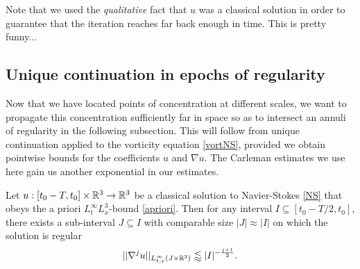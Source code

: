 \begin{remark}
	Note that we used the \textit{qualitative} fact that $u$ was a classical solution in order to guarantee that the iteration reaches far back enough in time. This is pretty funny...
\end{remark}



\subsection{Unique continuation in epochs of regularity}

Now that we have located points of concentration at different scales, we want to propagate this concentration sufficiently far in space so as to intersect an annuli of regularity in the following subsection. This will follow from unique continuation applied to the vorticity equation \eqref{vortNS}, provided we obtain pointwise bounds for the coefficients $u$ and $\nabla u$. The Carleman estimates we use here gain us another exponential in our estimates. 

\begin{proposition}\label{prop:epoch}
	Let $u : [t_0 - T, t_0] \times \mathbb R^3 \to \mathbb R^3$ be a classical solution to Navier-Stokes \eqref{NS}  that obeys the a priori $L^\infty_t L^3_x$-bound \eqref{apriori}. Then for any interval $I \subseteq [t_0 - T/2, t_0]$, there exists a sub-interval $J \subseteq I$ with comparable size $|J| \approx |I|$ on which the solution is regular
		\[
			||\nabla^j u ||_{L^\infty_{t, x} (J \times \mathbb R^3)} \lessapprox |I|^{-\frac{j + 1}{2}}.
		\]
\end{proposition}


